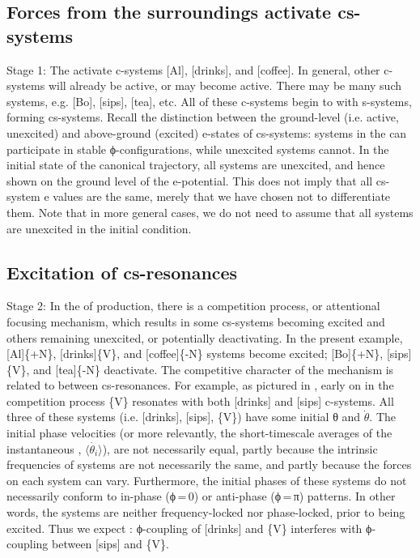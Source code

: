 \subsection{Forces from the surroundings activate cs-systems} 
Stage 1: The  activate c-systems [Al], [drinks], and [coffee]. In general, other c-systems will already be active, or may become active. There may be many such systems, e.g. [Bo], [sips], [tea], etc. All of these c-systems begin to  with s-systems, forming cs-systems. Recall the distinction between the ground-level (i.e. active, unexcited) and above-ground (excited) e-states of cs-systems: systems in the  can participate in stable ϕ-configurations, while unexcited systems cannot. In the initial state of the canonical trajectory, all systems are unexcited, and hence shown on the ground level of the e-potential. This does not imply that all cs-system e values are the same, merely that we have chosen not to differentiate them. Note that in more general cases, we do not need to assume that all systems are unexcited in the initial condition.

\subsection{Excitation of cs-resonances}
Stage 2: In the  of production, there is a competition process, or attentional focusing mechanism, which results in some cs-systems becoming excited and others remaining unexcited, or potentially deactivating. In the present example, [Al]\{+N\}, [drinks]\{V\}, and [coffee]\{-N\} systems become excited; [Bo]\linebreak\relax\{+N\}, [sips]\{V\}, and [tea]\{-N\} deactivate. The competitive character of the mechanism is related to  between cs-resonances. For example, as pictured in {}, early on in the competition process \{V\} resonates with both [drinks] and [sips] c-systems. All three of these systems (i.e. [drinks], [sips], \{V\}) have some initial θ and $\dot{\theta} $. The initial phase velocities (or more relevantly, the short-timescale averages of the instantaneous , $\langle\dot{\theta_i}\rangle$), are not necessarily equal, partly because the intrinsic frequencies of systems are not necessarily the same, and partly because the  forces on each system can vary. Furthermore, the initial phases of these systems do not necessarily conform to in-phase (ϕ\,=\,0) or anti-phase (ϕ\,=\,π) patterns. In other words, the systems are neither frequency-locked nor phase-locked, prior to being excited. Thus we expect : ϕ{}-coupling of [drinks] and \{V\} interferes with ϕ{}-coupling between [sips] and \{V\}.

